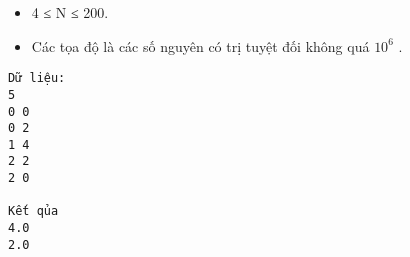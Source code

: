 \begin{itemize}
	\item     4 ≤ N ≤ 200.   
	\item     Các tọa độ là các số nguyên có trị tuyệt đối không quá $10^{6}$    .   
\end{itemize}
\begin{verbatim}
Dữ liệu:
5
0 0
0 2
1 4
2 2
2 0

Kết qủa
4.0
2.0
\end{verbatim}